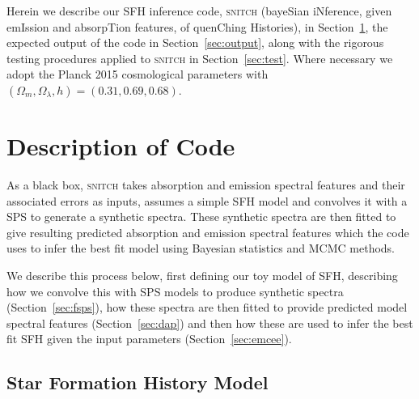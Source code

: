 \documentclass[useAMS,usenatbib]{mn2e}
\begin{document}


Herein we describe our SFH inference code, \textsc{snitch} (bayeSian iNference, given emIssion and absorpTion features, of quenChing Histories), in Section~\ref{sec:code}, the expected output of the code in Section~\ref{sec:output}, along with the rigorous testing procedures applied to \textsc{snitch} in Section~\ref{sec:test}. Where necessary we adopt the Planck 2015 \citep{planck16} cosmological parameters with $(\Omega_m, \Omega_{\lambda}, h) = (0.31, 0.69, 0.68)$. 

\section{Description of Code}\label{sec:code}

As a black box, \textsc{snitch} takes absorption and emission spectral features and their associated errors as inputs, assumes a simple SFH model and convolves it with a SPS to generate a synthetic spectra. These synthetic spectra are then fitted to give resulting predicted absorption and emission spectral features which the code uses to infer the best fit model using Bayesian statistics and MCMC methods. 

We describe this process below, first defining our toy model of SFH, describing how we convolve this with SPS models to produce synthetic spectra (Section~\ref{sec:fsps}), how these spectra are then fitted to provide predicted model spectral features (Section~\ref{sec:dap}) and then how these are used to infer the best fit SFH given the input parameters (Section~\ref{sec:emcee}). 

\subsection{Star Formation History Model}\label{sec:sfh}
\end{document}
